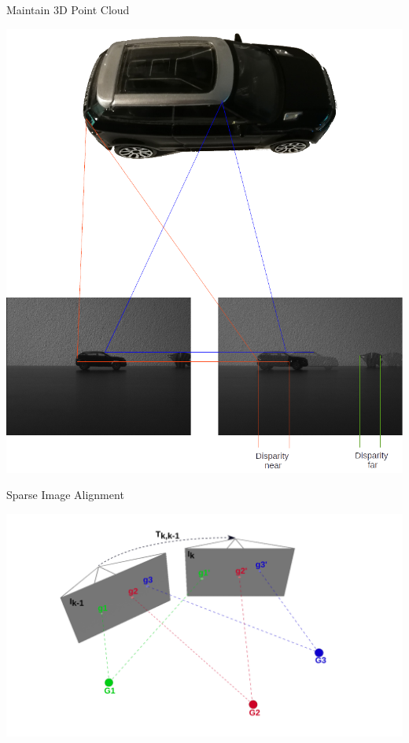 \documentclass[aspectratio=169]{beamer}
\begin{document}
\begin{frame}{Maintain 3D Point Cloud}
  \begin{center}
    \includegraphics[height=0.9\textheight]{../img/disparity_concept.png}
  \end{center}
\end{frame}

\begin{frame}{Sparse Image Alignment}
  \begin{center}
    \includegraphics[height=0.9\textheight]{../img/pose_estimation_sparse.png}
  \end{center}
\end{frame}
\end{document}
